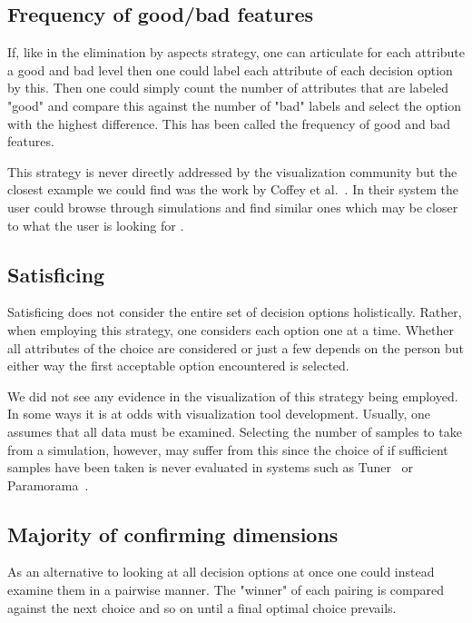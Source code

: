 \subsection{Frequency of good/bad
features}\label{frequency-of-goodbad-features}

If, like in the elimination by aspects strategy, one can articulate for
each attribute a good and bad level then one could label each attribute
of each decision option by this. Then one could simply count the number of
attributes that are labeled "good" and compare this against the number of
"bad" labels and select the option with the highest difference. This has
been called the frequency of good and bad features.

This strategy is never directly addressed by the visualization community
but the closest example we could find was the work by 
Coffey et al.~\citep{Coffey:2013}. In their system the user could browse
through simulations and find similar ones which may be closer to what
the user is looking for .

\subsection{Satisficing}\label{satisficing}

Satisficing does not consider the entire set of decision options
holistically. Rather, when employing this strategy, one considers each 
option one at a time. Whether all attributes of the choice are considered or
just a few depends on the person but either way the first acceptable option
encountered is selected.

We did not see any evidence in the visualization of this strategy being
employed. In some ways it is at odds with visualization tool development.
Usually, one assumes that all data must be examined. Selecting the number
of samples to take from a simulation, however, may suffer from this since
the choice of if sufficient samples have been taken is never evaluated
in systems such as Tuner~\citep{Torsney-Weir:2011} or 
Paramorama~\citep{Pretorius:2011}. 

\subsection{Majority of confirming
dimensions}\label{majority-of-confirming-dimensions}

As an alternative to looking at all decision options at once one could 
instead examine them in a pairwise manner. The "winner" of each pairing is
compared against the next choice and so on until a final optimal choice
prevails.

